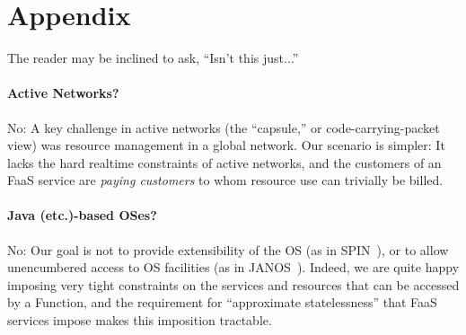 \section*{Appendix}

The reader may be inclined to ask, ``Isn't this just...''

\paragraph{Active Networks?}  No:  A key challenge in active networks (the
``capsule,'' or code-carrying-packet view) was resource management in a
global network.  Our scenario is simpler:  It lacks the hard realtime
constraints of active networks, and the customers of an FaaS service are
\emph{paying customers} to whom resource use can trivially be billed.

\paragraph{Java (etc.)-based OSes?}  No:  Our goal is not to provide
extensibility of the OS (as in SPIN~\cite{Bershad+:sosp15}), or to allow unencumbered
access to OS facilities (as in JANOS~\cite{Tullmann2002}).  Indeed, we are quite happy
imposing very tight constraints on the services and resources that
can be accessed by a Function, and the requirement for ``approximate
statelessness'' that FaaS services impose makes this imposition tractable.
